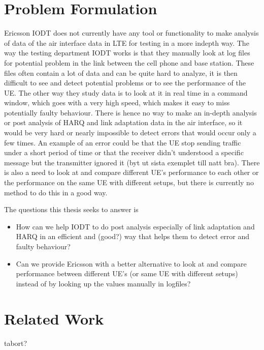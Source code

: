\documentclass[cropmarks, frame, english]{idamasterthesis}
\begin{document}
\section{Problem Formulation}
Ericsson IODT does not currently have any tool or functionality to make analysis of data of the air interface data in LTE for testing in a more indepth way. The way the testing department IODT works is that they manually look at log files for potential problem in the link between the cell phone and base station. These files often contain a lot of data and can be quite hard to analyze, it is then difficult to see and detect potential problems or to see the performance of the UE. The other way they study data is to look at it in real time in a command window, which goes with a very high speed, which makes it easy to miss potentially faulty behaviour. There is hence no way to make an in-depth analysis or post analysis of HARQ and link adaptation data in the air interface, so it would be very hard or nearly impossible to detect errors that would occur only a few times. An example of an error could be that the UE stop sending traffic under a short period of time or that the receiver didn't understood a specific message but the transmitter ignored it (byt ut sista exemplet till natt bra). There is also a need to look at and compare different UE's performance to each other or the performance on the same UE with different setups, but there is currently no method to do this in a good way. \newline

The questions this thesis seeks to answer is
\begin{itemize}
\item How can we help  IODT to do post analysis especially of link adaptation and HARQ in an efficient and (good?) way that helps them to detect error and faulty behaviour?

\item Can we provide Ericsson with a better alternative to look at and  compare performance between different UE's (or same UE with different setups) instead of by looking up the values manually in logfiles?
\end{itemize}




\section{Related Work}
tabort?
\end{document}
